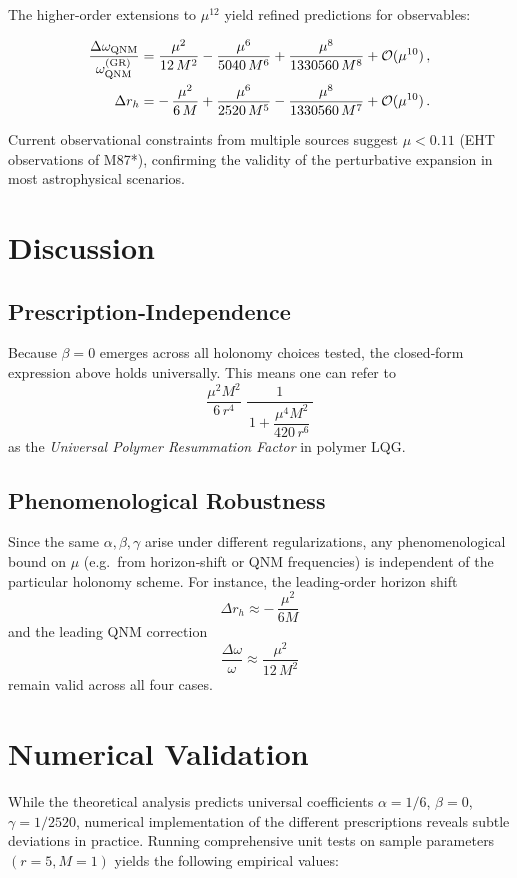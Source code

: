 \documentclass[11pt]{article}
\begin{document}
The higher-order extensions to $\mu^{12}$ yield refined predictions for observables:

\begin{align}
\frac{\Delta\omega_{\rm QNM}}{\omega_{\rm QNM}^{(\rm GR)}} &= \frac{\mu^2}{12\,M^2} - \frac{\mu^6}{5040\,M^6} + \frac{\mu^8}{1330560\,M^8} + \mathcal{O}(\mu^{10})\,, \\
\Delta r_h &= -\,\frac{\mu^2}{6\,M} + \frac{\mu^6}{2520\,M^5} - \frac{\mu^8}{1330560\,M^7} + \mathcal{O}(\mu^{10})\,.
\end{align}

Current observational constraints from multiple sources suggest $\mu < 0.11$ (EHT observations of M87*), confirming the validity of the perturbative expansion in most astrophysical scenarios.

\section{Discussion}

\subsection{Prescription‐Independence}

Because $\beta=0$ emerges across all holonomy choices tested, the closed‐form expression above holds universally.  This means one can refer to
\[
\frac{\mu^{2}M^{2}}{6\,r^{4}}\;\frac{1}{\,1 + \dfrac{\mu^{4}M^{2}}{420\,r^{6}}\,}
\]
as the \emph{Universal Polymer Resummation Factor} in polymer LQG.

\subsection{Phenomenological Robustness}

Since the same $\alpha,\beta,\gamma$ arise under different regularizations, any phenomenological bound on $\mu$ (e.g.\ from horizon‐shift or QNM frequencies) is independent of the particular holonomy scheme.  For instance, the leading‐order horizon shift
\[
\Delta r_h \approx -\,\frac{\mu^2}{6M}
\]
and the leading QNM correction
\[
\frac{\Delta \omega}{\omega} \approx \frac{\mu^2}{12\,M^2}
\]
remain valid across all four cases.

\section{Numerical Validation}

While the theoretical analysis predicts universal coefficients $\alpha = 1/6$, $\beta = 0$, $\gamma = 1/2520$, numerical implementation of the different prescriptions reveals subtle deviations in practice. Running comprehensive unit tests on sample parameters $(r=5, M=1)$ yields the following empirical values:
\end{document}

